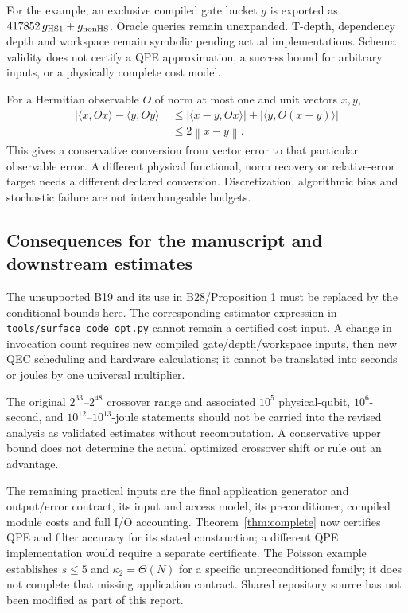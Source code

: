 \documentclass[11pt,a4paper]{article}
\newcommand{\norm}[1]{\left\lVert #1\right\rVert}
\begin{document}
For the example, an exclusive compiled gate bucket $g$ is exported as $417852\,g_{\rm HS1}+g_{\rm nonHS}$. Oracle queries remain unexpanded. T-depth, dependency depth and workspace remain symbolic pending actual implementations. Schema validity does not certify a QPE approximation, a success bound for arbitrary inputs, or a physically complete cost model.

For a Hermitian observable $O$ of norm at most one and unit vectors $x,y$,
\begin{align}
 |\langle x,Ox\rangle-\langle y,Oy\rangle|
 &\leq|\langle x-y,Ox\rangle|+|\langle y,O(x-y)\rangle|\\
 &\leq2\norm{x-y}.
\end{align}
This gives a conservative conversion from vector error to that particular observable error. A different physical functional, norm recovery or relative-error target needs a different declared conversion. Discretization, algorithmic bias and stochastic failure are not interchangeable budgets.

\subsection{Consequences for the manuscript and downstream estimates}
The unsupported B19 and its use in B28/Proposition 1 must be replaced by the conditional bounds here. The corresponding estimator expression in \texttt{tools/surface\_code\_opt.py} cannot remain a certified cost input. A change in invocation count requires new compiled gate/depth/workspace inputs, then new QEC scheduling and hardware calculations; it cannot be translated into seconds or joules by one universal multiplier.

The original $2^{33}$--$2^{48}$ crossover range and associated $10^5$ physical-qubit, $10^6$-second, and $10^{12}$--$10^{13}$-joule statements should not be carried into the revised analysis as validated estimates without recomputation. A conservative upper bound does not determine the actual optimized crossover shift or rule out an advantage.

The remaining practical inputs are the final application generator and output/error contract, its input and access model, its preconditioner, compiled module costs and full I/O accounting. Theorem~\ref{thm:complete} now certifies QPE and filter accuracy for its stated construction; a different QPE implementation would require a separate certificate. The Poisson example establishes $s\leq5$ and $\kappa_2=\Theta(N)$ for a specific unpreconditioned family; it does not complete that missing application contract. Shared repository source has not been modified as part of this report.
\end{document}
